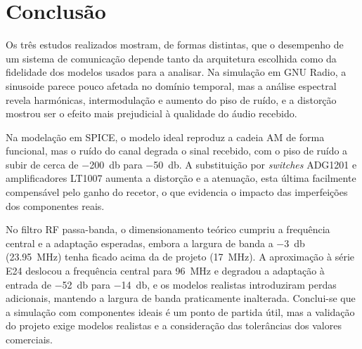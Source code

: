 \section{Conclusão}
\label{sec:conclusao}
Os três estudos realizados mostram, de formas distintas, que o desempenho de um sistema de comunicação depende tanto da arquitetura
escolhida como da fidelidade dos modelos usados para a analisar. Na simulação em GNU Radio, a sinusoide parece pouco afetada no domínio temporal,
mas a análise espectral revela harmónicas, intermodulação e aumento do piso de ruído, e a distorção mostrou ser o efeito mais prejudicial
à qualidade do áudio recebido.
 
Na modelação em SPICE, o modelo ideal reproduz a cadeia AM de forma funcional, mas o ruído do canal degrada o sinal recebido, com o piso de ruído a subir
de cerca de \qty{-200}{\decibel} para \qty{-50}{\decibel}. A substituição por \textit{switches} ADG1201 e amplificadores LT1007 aumenta a distorção e a atenuação,
esta última facilmente compensável pelo ganho do recetor, o que evidencia o impacto das imperfeições dos componentes reais.
 
No filtro RF passa-banda, o dimensionamento teórico cumpriu a frequência central e a adaptação esperadas, embora a largura de banda a \qty{-3}{\decibel}
(\qty{23.95}{\mega\hertz}) tenha ficado acima da de projeto (\qty{17}{\mega\hertz}). A aproximação à série E24 deslocou a frequência central para \qty{96}{\mega\hertz} e degradou
a adaptação à entrada de \qty{-52}{\decibel} para \qty{-14}{\decibel}, e os modelos realistas introduziram perdas adicionais, mantendo a largura de banda praticamente inalterada.
Conclui-se que a simulação com componentes ideais é um ponto de partida útil, mas a validação do projeto exige modelos realistas e a consideração das tolerâncias dos valores comerciais.